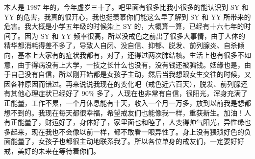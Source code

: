\begin{case}
    本人是 1987 年的，今年虚岁三十了。吧里面有很多比我小很多的能认识到 SY 和 YY 的危害，我真的很开心，我也挺羡慕你们能这么早了解到 SY 和 YY 所带来的危害。我大概是小学五年级的时候染上 SY 的，大概算一算，已经有十六七年的时间了。因为 SY 和 YY 频率很高，所以没戒色之前出了很多大事情，由于人体的精华都消耗得差不多了，导致人自闭、没自信、抑郁、脱发、前列腺炎、自杀倾向，基本上大家有的症状我都有，对了，还得过两次肺结核。生活上也有很多不如意，由于得病没有上大学，一技之长什么也没有，没有钱还被骗钱。姻缘也是，由于自己没有自信，所以刚开始都是女孩子主动，然后当我想跟女生交往的时候，又因各种原因而错过。再来说说我现在的变化吧（戒色近六百天），脱发、前列腺还有其他心理症状已经好了 90\% 多了，人现在也非常有自信，很阳光，浑身充满了正能量，工作不累，一个月休息能有十天，收入一个月一万多，放到以前我是想都想不到的。我现在每天都很幸福，希望戒友们也能像我一样，重获新生。加油！人有正能量了，财运好了，身体好了，家里面也和睦了，人变得帅气阳光，异性缘也多起来，现在我也不会像以前一样，都不敢看一眼异性了。身上没有猥琐好色的负面能量了，女孩子也都很主动地联系我了。所以各位单身的戒友们，一定要好好戒，美好的未来在等待着你们。


\end{case}

